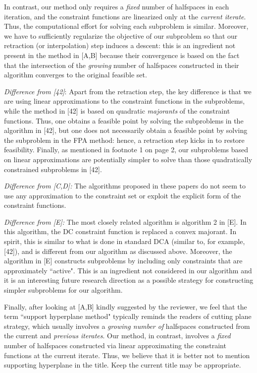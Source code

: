 \documentclass{article}
\begin{document}
\begin{enumerate}
    In contrast, our method only requires a {\it fixed} number of halfspaces in each iteration, and the constraint functions are linearized only at the \emph{current iterate}. Thus, the computational effort for solving each subproblem is similar. Moreover, we have to sufficiently regularize the objective of our subproblem so that our retraction (or interpolation) step induces a descent: this is an ingredient not present in the method in [A,B] because their convergence is based on the fact that the intersection of the \emph{growing} number of halfspaces constructed in their algorithm converges to the original feasible set.
    
    {\it Difference from [42]}: Apart from the retraction step, the key difference is that we are using linear approximations to the constraint functions in the subproblems, while the method in [42] is based on quadratic \emph{majorants} of the constraint functions. Thus, one obtains a feasible point by solving the subproblems in the algorithm in [42], but one does not necessarily obtain a feasible point by solving the subproblem in the FPA method: hence, a retraction step kicks in to restore feasibility. Finally, as mentioned in footnote 1 on page 2, our subproblems based on linear approximations are potentially simpler to solve than those quadratically constrained subproblems in [42].
    
    {\it Difference from [C,D]:} The algorithms proposed in these papers do not seem to use any approximation to the constraint set or exploit the explicit form of the constraint functions.
    
    {\it Difference from [E]:} The most closely related algorithm is algorithm 2 in [E]. In this algorithm, the DC constraint function is replaced a convex majorant. In spirit, this is similar to what is done in standard DCA (similar to, for example, [42]), and is different from our algorithm as discussed above. Moreover, the algorithm in [E] constructs subproblems by including only constraints that are approximately ``active". This is an ingredient not considered in our algorithm and it is an interesting future research direction as a possible strategy for constructing simpler subproblems for our algorithm.
    
    Finally, after looking at [A,B] kindly suggested by the reviewer, we feel that the term ``support hyperplane method" typically reminds the readers of cutting plane strategy, which usually involves a {\em growing number of} halfspaces constructed from the current and {\em previous iterates}. Our method, in contrast, involves a {\em fixed} number of halfspaces constructed via linear approximating the constraint functions at the current iterate. Thus, we believe that it is better not to mention supporting hyperplane in the title. Keep the current title may be appropriate.
    

\end{enumerate}
\end{document}
